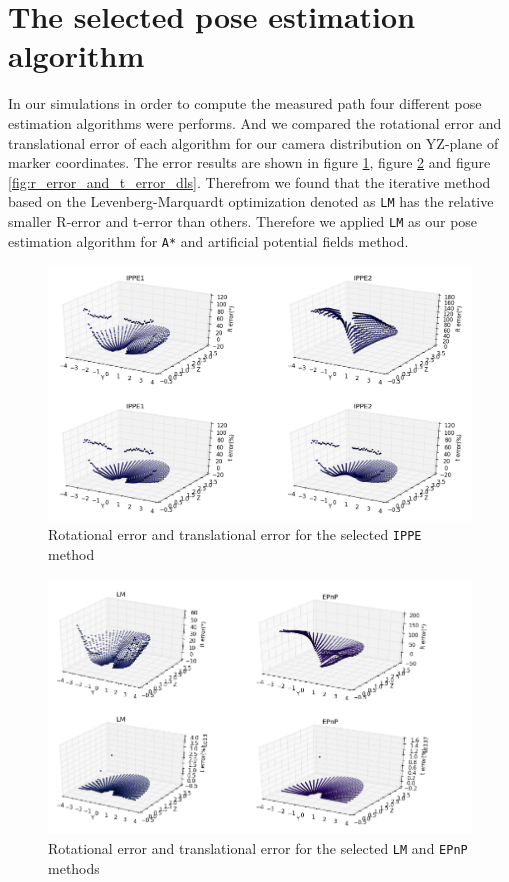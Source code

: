 \section{The selected pose estimation algorithm}
In our simulations in order to compute the measured path four different pose estimation algorithms were performs. And we compared the rotational error and translational error of each algorithm for our camera distribution on YZ-plane of marker coordinates. The error results are shown in figure \ref{fig:r_error_and_t_error_ippe}, figure \ref{fig:r_error_and_t_error_lm} and figure \ref{fig:r_error_and_t_error_dls}. Therefrom we found that the iterative method based on the Levenberg-Marquardt optimization denoted as \texttt{LM} has the relative smaller R-error and t-error than others. Therefore we applied \texttt{LM} as our pose estimation algorithm for \texttt{A*} and artificial potential fields method.
\begin{figure}[H]
\centering
\includegraphics[scale=0.5]{./fig/r_error_and_t_error_ippe.png}
\caption{Rotational error and translational error for the selected \texttt{IPPE} method\cite{collins2014infinitesimal}}
\label{fig:r_error_and_t_error_ippe}
\end{figure}

\begin{figure}[H]
\hspace*{1.5cm}
\centering
\includegraphics[scale=0.8]{./fig/r_error_and_t_error_ippe_lm.png}
\caption{Rotational error and translational error for the selected \texttt{LM} and \texttt{EPnP} methods\cite{lepetit2009epnp}}
\label{fig:r_error_and_t_error_lm}
\end{figure}

